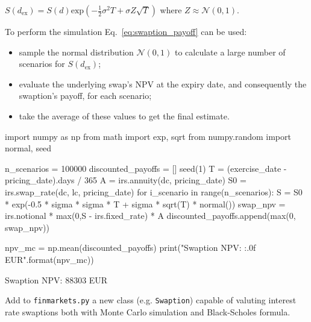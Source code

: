 \(S(d_{\mathrm{ex}}) = S(d)\mathrm{exp}(-\frac{1}{2}\sigma^{2}T+\sigma Z\sqrt{T})\)
\noindent
where $Z\approx\mathcal{N}(0,1)$. %

To perform the simulation Eq.~\ref{eq:swaption_payoff} can be used:

\begin{itemize}
\tightlist
\item sample the normal distribution \(\mathcal{N}(0, 1)\) to calculate a large number of scenarios for \(S(d_{\mathrm{ex}})\);
\item evaluate the underlying swap's NPV at the expiry date, and consequently the swaption's payoff, for each scenario;
\item take the average of these values to get the final estimate.
\end{itemize}

\begin{ipython}
import numpy as np
from math import exp, sqrt
from numpy.random import normal, seed

n_scenarios = 100000
discounted_payoffs = []
seed(1)
T = (exercise_date - pricing_date).days / 365
A = irs.annuity(dc, pricing_date)
S0 = irs.swap_rate(dc, lc, pricing_date)
for i_scenario in range(n_scenarios):
    S = S0 * exp(-0.5 * sigma * sigma * T +
        sigma * sqrt(T) * normal())
    swap_npv = irs.notional * max(0,S - irs.fixed_rate) * A
    discounted_payoffs.append(max(0, swap_npv))

npv_mc = np.mean(discounted_payoffs)
print("Swaption NPV: {:.0f} EUR".format(npv_mc))
\end{ipython}
\begin{ioutput}
Swaption NPV: 88303 EUR
\end{ioutput}

%

\begin{finmarkets}
Add to \texttt{finmarkets.py} a new class (e.g. \texttt{Swaption}) capable of valuting interest rate swaptions both with Monte Carlo simulation and Black-Scholes formula.
\end{finmarkets}

